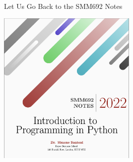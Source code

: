 \documentclass[notes, aspectratio=1610]{beamer}
\begin{document}
\begin{frame}{Let Us Go Back to the SMM692 Notes}{}
	\centering 

	\includegraphics[width=0.5\textwidth]{images/smm692_notes}
\end{frame}


\end{document}
